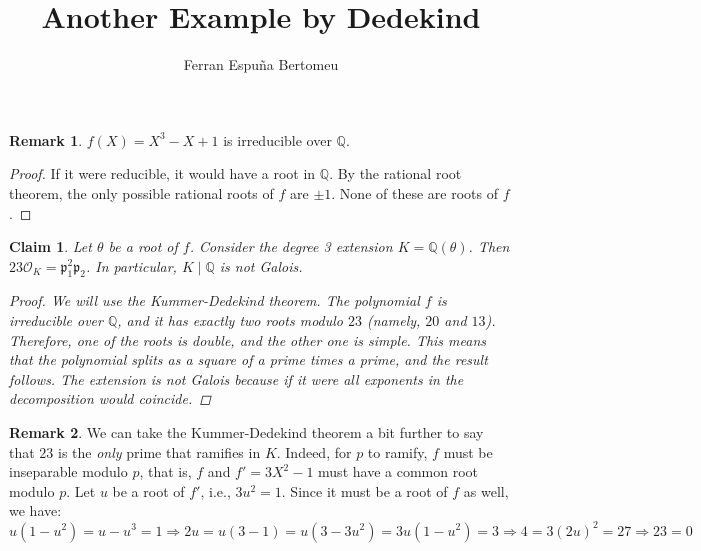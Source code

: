 \documentclass[11pt]{article}
\title{Another Example by Dedekind}
\author{Ferran Espuña Bertomeu}
\newtheorem{claim}[theorem]{Claim}
\theoremstyle{definition}
\newtheorem*{rk}{Remark}
\begin{document}
    \maketitle

    \begin{rk}
        $f(X)=X^3-X+1$ is irreducible over $\mathbb{Q}$.
        \begin{proof}
            If it were reducible, it would have a root in $\mathbb{Q}$.
            By the rational root theorem, the only possible rational roots of  $f$ are $\pm 1$.
            None of these are roots of $f$.
        \end{proof}
    \end{rk}

    \begin{claim}
        Let $\theta$ be a root of $f$.
        Consider the degree 3 extension $K = \mathbb{Q}(\theta)$.
        Then $23 \mathcal{O}_K = \mathfrak{p}_1^2 \mathfrak{p}_2$.
        In particular, $K\mid\mathbb{Q}$ is not Galois.
        \begin{proof}
            We will use the Kummer-Dedekind theorem.
            The polynomial $f$ is irreducible over $\mathbb{Q}$,
            and it has exactly two roots modulo $23$ (namely, $20$ and $13$).
            Therefore, one of the roots is double, and the other one is simple.
            This means that the polynomial splits as a square of a prime times a prime,
            and the result follows.
            The extension is not Galois because if it were all exponents in the decomposition would coincide.
        \end{proof}
    \end{claim}

    \begin{rk}
        We can take the Kummer-Dedekind theorem a bit further to say that $23$ is the \textit{only} prime that ramifies in $K$.
        Indeed, for $p$ to ramify, $f$ must be inseparable modulo $p$, that is, $f$ and $f' = 3X^2-1$ must have a common root modulo $p$.
        Let $u$ be a root of $f'$, i.e., $3u^2=1$.
        Since it must be a root of $f$ as well, we have:
        \[u(1-u^2) = u-u^3 = 1 \Rightarrow 2u = u(3-1) = u(3-3u^2) = 3u(1-u^2) = 3 \Rightarrow 4 = 3(2u)^2 = 27 \Rightarrow 23 = 0\]

    \end{rk}
\end{document}
